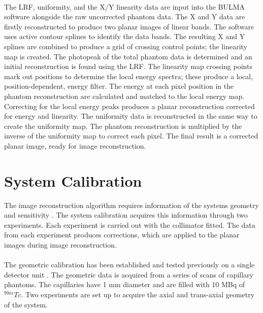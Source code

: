 \paragraph{}
The \acrshort{LRF}, uniformity, and the X/Y linearity data are input into the BULMA software alongside the raw uncorrected phantom data. The X and Y data are firstly reconstructed to produce two planar images of linear bands. The software uses active contour splines to identify the data bands. The resulting X and Y splines are combined to produce a grid of crossing control points; the linearity map is created. The photopeak of the total phantom data is determined and an initial reconstruction is found using the \acrshort{LRF}. The linearity map crossing points mark out positions to determine the local energy spectra; these produce a local, position-dependent, energy filter. The energy at each pixel position in the phantom reconstruction are calculated and matched to the local energy map. Correcting for the local energy peaks produces a planar reconstruction corrected for energy and linearity. The uniformity data is reconstructed in the same way to create the uniformity map. The phantom reconstruction is multiplied by the inverse of the uniformity map to correct each pixel. The final result is a corrected planar image, ready for image reconstruction. 


\section{System Calibration}
The image reconstruction algorithm requires information of the systems geometry and sensitivity \cite{Beque2003CharacterizationGeometry}. The system calibration acquires this information through two experiments. Each experiment is carried out with the collimator fitted. The data from each experiment produces corrections, which are applied to the planar images during image reconstruction. 
 \paragraph{}
The geometric calibration has been established and tested previously on a single detector unit \cite{8340862}. The geometric data is acquired from a series of scans of capillary phantoms. The capillaries have 1 mm diameter and are filled with 10 MBq of $^{99m}Tc$. Two experiments are set up to acquire the axial and trans-axial geometry of the system. 
